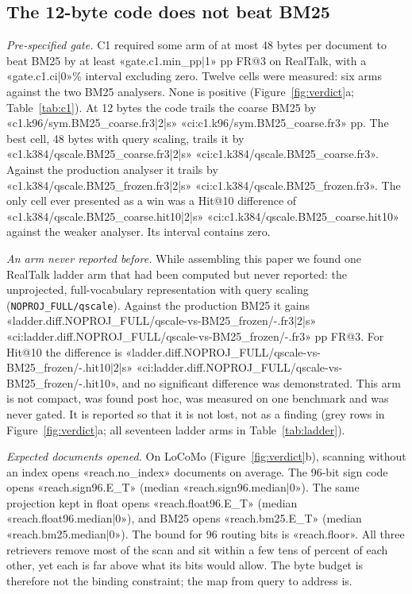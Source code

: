 \documentclass[11pt,a4paper]{article}
\makeatletter
\newcommand{\FR}{FR@3}
\makeatother
\begin{document}


\subsection{The 12-byte code does not beat BM25}\label{sec:verdict}
\emph{Pre-specified gate.} C1 required some arm of at most 48 bytes per document to beat BM25 by at least «gate.c1.min_pp|1» pp \FR{} on RealTalk, with a «gate.c1.ci|0»\% interval excluding zero. Twelve cells were measured: six arms against the two BM25 analysers. None is positive (Figure~\ref{fig:verdict}a; Table~\ref{tab:c1}). At 12 bytes the code trails the coarse BM25 by «c1.k96/sym.BM25_coarse.fr3|2|s» «ci:c1.k96/sym.BM25_coarse.fr3» pp. The best cell, 48 bytes with query scaling, trails it by «c1.k384/qscale.BM25_coarse.fr3|2|s» «ci:c1.k384/qscale.BM25_coarse.fr3». Against the production analyser it trails by «c1.k384/qscale.BM25_frozen.fr3|2|s» «ci:c1.k384/qscale.BM25_frozen.fr3». The only cell ever presented as a win was a Hit@10 difference of «c1.k384/qscale.BM25_coarse.hit10|2|s» «ci:c1.k384/qscale.BM25_coarse.hit10» against the weaker analyser. Its interval contains zero.

\emph{An arm never reported before.} While assembling this paper we found one RealTalk ladder arm that had been computed but never reported: the unprojected, full-vocabulary representation with query scaling (\texttt{NOPROJ\_FULL/qscale}). Against the production BM25 it gains «ladder.diff.NOPROJ_FULL/qscale-vs-BM25_frozen/-.fr3|2|s» «ci:ladder.diff.NOPROJ_FULL/qscale-vs-BM25_frozen/-.fr3» pp \FR{}. For Hit@10 the difference is «ladder.diff.NOPROJ_FULL/qscale-vs-BM25_frozen/-.hit10|2|s» «ci:ladder.diff.NOPROJ_FULL/qscale-vs-BM25_frozen/-.hit10», and no significant difference was demonstrated. This arm is not compact, was found post hoc, was measured on one benchmark and was never gated. It is reported so that it is not lost, not as a finding (grey rows in Figure~\ref{fig:verdict}a; all seventeen ladder arms in Table~\ref{tab:ladder}).

\emph{Expected documents opened.} On LoCoMo (Figure~\ref{fig:verdict}b), scanning without an index opens «reach.no_index» documents on average. The 96-bit sign code opens «reach.sign96.E_T» (median «reach.sign96.median|0»). The same projection kept in float opens «reach.float96.E_T» (median «reach.float96.median|0»), and BM25 opens «reach.bm25.E_T» (median «reach.bm25.median|0»). The bound for 96 routing bits is «reach.floor». All three retrievers remove most of the scan and sit within a few tens of percent of each other, yet each is far above what its bits would allow. The byte budget is therefore not the binding constraint; the map from query to address is.
\end{document}

